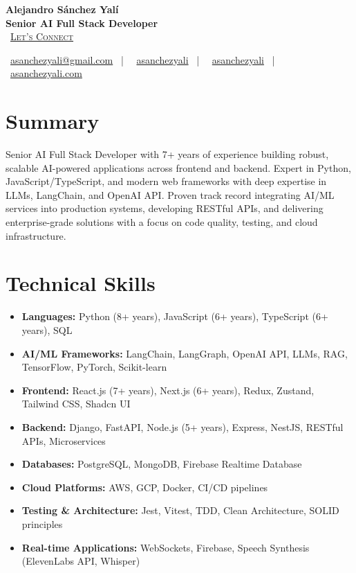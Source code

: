 \documentclass[letterpaper,11pt]{article}
\newcommand{\normalfaCalendar}{{\mdseries\faCalendar}}
\newcommand{\normalfaEnvelope}{{\mdseries\faEnvelope}}
\newcommand{\normalfaLinkedin}{{\mdseries\faLinkedin}}
\newcommand{\normalfaGithub}{{\mdseries\faGithub}}
\newcommand{\normalfaGlobe}{{\mdseries\faGlobe}}
\begin{document}
\begin{center}
\textbf{\Huge Alejandro Sánchez Yalí}\\[0.2em]
\textbf{\Large Senior AI Full Stack Developer}\\[0.4em]
\small
\normalfaCalendar\ \href{https://cal.com/asanchezyali/full-time-opportunities}{\textsc{Let's Connect}}

\vspace{0.8em}
\normalfaEnvelope\ \href{mailto:asanchezyali@gmail.com}{asanchezyali@gmail.com}  ~|~
\normalfaLinkedin\ \href{https://www.linkedin.com/in/asanchezyali}{asanchezyali} ~|~
\normalfaGithub\ \href{https://github.com/asanchezyali}{asanchezyali}  ~|~
\normalfaGlobe\ \href{https://asanchezyali.com}{asanchezyali.com}
\end{center}

\section{Summary}
Senior AI Full Stack Developer with 7+ years of experience building robust, scalable AI-powered applications across frontend and backend. Expert in Python, JavaScript/TypeScript, and modern web frameworks with deep expertise in LLMs, LangChain, and OpenAI API. Proven track record integrating AI/ML services into production systems, developing RESTful APIs, and delivering enterprise-grade solutions with a focus on code quality, testing, and cloud infrastructure.

\section{Technical Skills}
\begin{itemize}[leftmargin=*, itemsep=0pt]
  \item \textbf{Languages:} Python (8+ years), JavaScript (6+ years), TypeScript (6+ years), SQL
  \item \textbf{AI/ML Frameworks:} LangChain, LangGraph, OpenAI API, LLMs, RAG, TensorFlow, PyTorch, Scikit-learn
  \item \textbf{Frontend:} React.js (7+ years), Next.js (6+ years), Redux, Zustand, Tailwind CSS, Shadcn UI
  \item \textbf{Backend:} Django, FastAPI, Node.js (5+ years), Express, NestJS, RESTful APIs, Microservices
  \item \textbf{Databases:} PostgreSQL, MongoDB, Firebase Realtime Database
  \item \textbf{Cloud Platforms:} AWS, GCP, Docker, CI/CD pipelines
  \item \textbf{Testing \& Architecture:} Jest, Vitest, TDD, Clean Architecture, SOLID principles
  \item \textbf{Real-time Applications:} WebSockets, Firebase, Speech Synthesis (ElevenLabs API, Whisper)
\end{itemize}
\end{document}
